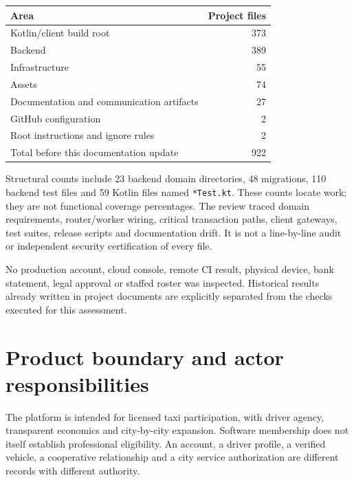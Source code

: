 \documentclass[11pt,a4paper]{article}
\newcommand{\src}[1]{{\small\nolinkurl{#1}}}
\begin{document}
\begin{center}\begin{tabular}{lr}
\toprule Area & Project files \\\midrule
Kotlin/client build root & 373 \\
Backend & 389 \\
Infrastructure & 55 \\
Assets & 74 \\
Documentation and communication artifacts & 27 \\
GitHub configuration & 2 \\
Root instructions and ignore rules & 2 \\\midrule
Total before this documentation update & 922 \\\bottomrule
\end{tabular}\end{center}

Structural counts include 23 backend domain directories, 48 migrations, 110
backend test files and 59 Kotlin files named \src{*Test.kt}. These counts locate
work; they are not functional coverage percentages. The review traced domain
requirements, router/worker wiring, critical transaction paths, client gateways,
test suites, release scripts and documentation drift. It is not a line-by-line
audit or independent security certification of every file.

No production account, cloud console, remote CI result, physical device, bank
statement, legal approval or staffed roster was inspected. Historical results
already written in project documents are explicitly separated from the checks
executed for this assessment.

\section{Product boundary and actor responsibilities}
The platform is intended for licensed taxi participation, with driver agency,
transparent economics and city-by-city expansion. Software membership does not
itself establish professional eligibility. An account, a driver profile, a
verified vehicle, a cooperative relationship and a city service authorization
are different records with different authority.
\end{document}
